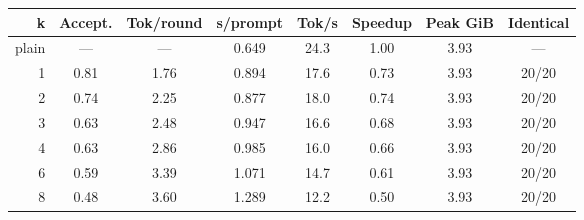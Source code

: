 \begin{tabular}{rccccccc}
\hline
k & Accept. & Tok/round & s/prompt & Tok/s & Speedup & Peak GiB & Identical \\
\hline
plain & --- & --- & 0.649 & 24.3 & 1.00 & 3.93 & --- \\
1 & 0.81 & 1.76 & 0.894 & 17.6 & 0.73 & 3.93 & 20/20 \\
2 & 0.74 & 2.25 & 0.877 & 18.0 & 0.74 & 3.93 & 20/20 \\
3 & 0.63 & 2.48 & 0.947 & 16.6 & 0.68 & 3.93 & 20/20 \\
4 & 0.63 & 2.86 & 0.985 & 16.0 & 0.66 & 3.93 & 20/20 \\
6 & 0.59 & 3.39 & 1.071 & 14.7 & 0.61 & 3.93 & 20/20 \\
8 & 0.48 & 3.60 & 1.289 & 12.2 & 0.50 & 3.93 & 20/20 \\
\hline
\end{tabular}
